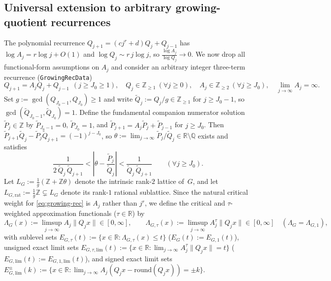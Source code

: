 \documentclass[11pt]{article}
\theoremstyle{definition}
\theoremstyle{remark}
\newcommand{\R}{\mathbb{R}}
\newcommand{\Z}{\mathbb{Z}}
\newcommand{\Q}{\mathbb{Q}}
\newcommand{\Lam}{\Lambda}
\begin{document}
\subsection{Universal extension to arbitrary growing-quotient recurrences}\label{sec:growing-rec}

The polynomial recurrence $Q_{j+1}=(cj^r+d)Q_j+Q_{j-1}$ has $\log A_j=r\log j+O(1)$
and $\log Q_j\sim r\,j\log j$, so $\frac{\log A_j}{\log Q_j}\to 0$. We now drop
all functional-form assumptions on $A_j$ and consider an arbitrary integer
three-term recurrence (\texttt{GrowingRecData})
\begin{equation}\label{eq:growing-rec}
Q_{j+1}=A_j Q_j+Q_{j-1}\ \ (j\ge J_0\ge 1),\quad Q_j\in\Z_{\ge1}\ (\forall j\ge0),
\quad A_j\in\Z_{\ge2}\ (\forall j\ge J_0),\quad \lim_{j\to\infty}A_j=\infty.
\end{equation}
Set $g:=\gcd(Q_{J_0-1},Q_{J_0})\ge1$ and write $\widetilde Q_j:=Q_j/g\in\Z_{\ge1}$
for $j\ge J_0-1$, so $\gcd(\widetilde Q_{J_0-1},\widetilde Q_{J_0})=1$. Define the
fundamental companion numerator solution $\widetilde P_j\in\Z$ by
$\widetilde P_{J_0-1}=0$, $\widetilde P_{J_0}=1$, and
$\widetilde P_{j+1}=A_j\widetilde P_j+\widetilde P_{j-1}$ for $j\ge J_0$. Then
$\widetilde P_{j+1}\widetilde Q_j-\widetilde P_j\widetilde Q_{j+1}=(-1)^{j-J_0}$,
so $\theta:=\lim_{j\to\infty}\widetilde P_j/\widetilde Q_j\in\R\setminus\Q$ exists
and satisfies
\begin{equation}\label{eq:growing-theta-error}
\frac{1}{2\,\widetilde Q_j\,\widetilde Q_{j+1}}
<\left|\theta-\frac{\widetilde P_j}{\widetilde Q_j}\right|
<\frac{1}{\widetilde Q_j\,\widetilde Q_{j+1}}
\qquad(\forall j\ge J_0).
\end{equation}
Let $L_G:=\frac{1}{g}(\Z+\Z\theta)$ denote the intrinsic rank-$2$ lattice of~$G$,
and let $L_{G,\mathrm{rat}}:=\frac{1}{g}\Z\subsetneq L_G$ denote its rank-$1$
rational sublattice. Since the natural critical weight for \eqref{eq:growing-rec}
is $A_j$ rather than $j^r$, we define the critical and $\tau$-weighted
approximation functionals ($\tau\in\R$) by
\[
\Lam_G(x):=\limsup_{j\to\infty} A_j\|Q_j x\|\in[0,\infty],\qquad
\Lam_{G,\tau}(x):=\limsup_{j\to\infty} A_j^\tau\|Q_j x\|\in[0,\infty]\quad(\Lam_G=\Lam_{G,1}),
\]
with sublevel sets $E_{G,\tau}(t):=\{x\in\R:\Lam_{G,\tau}(x)\le t\}$ ($E_G(t):=E_{G,1}(t)$),
unsigned exact limit sets $E_{G,\tau,\mathrm{lim}}(t):=\{x\in\R:\lim_{j\to\infty}A_j^\tau\|Q_j x\|=t\}$
($E_{G,\mathrm{lim}}(t):=E_{G,1,\mathrm{lim}}(t)$), and signed exact limit sets
$E_{G,\mathrm{lim}}^\pm(k):=\{x\in\R:\lim_{j\to\infty}A_j(Q_j x-\mathrm{round}(Q_j x))=\pm k\}$.
\end{document}
